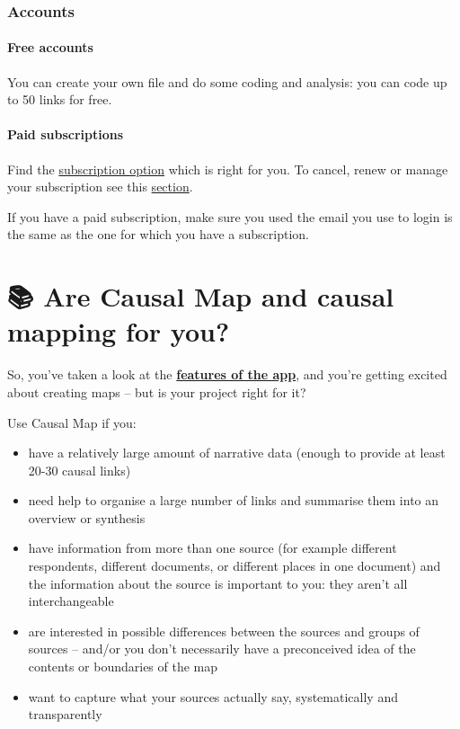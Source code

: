 \documentclass[
]{book}
\providecommand{\tightlist}{%
  \setlength{\itemsep}{0pt}\setlength{\parskip}{0pt}}
\begin{document}
\hypertarget{accounts}{%
\subsection{Accounts}\label{accounts}}

\hypertarget{free-accounts}{%
\subsubsection{Free accounts}\label{free-accounts}}

You can create your own file and do some coding and analysis: you can code up to 50 links for free.

\hypertarget{paid-subscriptions}{%
\subsubsection{Paid subscriptions}\label{paid-subscriptions}}

Find the \href{https://causalmap.app/subscriptions/}{subscription option} which is right for you. To cancel, renew or manage your subscription see this \protect\hyperlink{xmanage_your_subscription}{section}.

If you have a paid subscription, make sure you used the email you use to login is the same as the one for which you have a subscription.

\hypertarget{are-causal-map-and-causal-mapping-for-you}{%
\chapter{📚 Are Causal Map and causal mapping for you?}\label{are-causal-map-and-causal-mapping-for-you}}

So, you've taken a look at the \textbf{\protect\hyperlink{xfeatures}{features of the app}}, and you're getting excited about creating maps -- but is your project right for it?

Use Causal Map if you:

\begin{itemize}
\tightlist
\item
  have a relatively large amount of narrative data (enough to provide at least 20-30 causal links)
\item
  need help to organise a large number of links and summarise them into an overview or synthesis
\item
  have information from more than one source (for example different respondents, different documents, or different places in one document) and the information about the source is important to you: they aren't all interchangeable
\item
  are interested in possible differences between the sources and groups of sources -- and/or you don't necessarily have a preconceived idea of the contents or boundaries of the map
\item
  want to capture what your sources actually say, systematically and transparently
\end{itemize}
\end{document}
